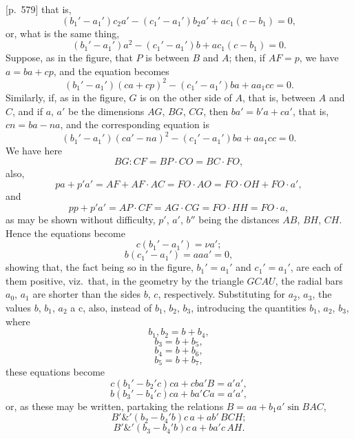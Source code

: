 \documentclass[11pt,a4paper]{article}
\theoremstyle{plain}
\theoremstyle{definition}
\theoremstyle{remark}
\begin{document}
[p.~579] that is,
\[
(b_1' - a_1') c_2 a' - (c_1' - a_1') b_2 a' + a c_1 (c - b_1) = 0,
\]
or, what is the same thing,
\[
(b_1' - a_1') a^2 - (c_1' - a_1') b + a c_1 (c - b_1) = 0.
\]
Suppose, as in the figure, that $P$ is between $B$ and $A$; then, if $AF = p$, we have $a = ba + cp$, and the equation becomes
\[
(b_1' - a_1') (ca + cp)^2 - (c_1' - a_1') b a + a a_1 c c = 0.
\]
Similarly, if, as in the figure, $G$ is on the other side of $A$, that is, between $A$ and $C$, and if $a$, $a'$ be the dimensions $AG$, $BG$, $CG$, then $b a' = b' a + c a'$, that is, $cn = ba - n a$, and the corresponding equation is
\[
(b_1' - a_1') (ca' - n a)^2 - (c_1' - a_1') b a + a a_1 c c = 0.
\]
We have here
\[
BG\colon CF = BP\cdot CO = BC\cdot FO,
\]
also,
\[
pa + p'a' = AF + AF\cdot AC = FO\cdot AO = FO\cdot OH + FO\cdot a',
\]
and
\[
pp + p'a' = AP\cdot CF = AG\cdot CG = FO\cdot HH = FO\cdot a,
\]
as may be shown without difficulty, $p'$, $a'$, $b''$ being the distances $AB$, $BH$, $CH$. Hence the equations become
\[
c(b_1' - a_1') = \nu a';
\]
\[
b(c_1' - a_1') = a a a' = 0,
\]
showing that, the fact being so in the figure, $b_1' = a_1'$ and $c_1' = a_1'$, are each of them positive, viz.\ that, in the geometry by the triangle $GCAU$, the radial bars $a_0$, $a_1$ are shorter than the sides $b$, $c$, respectively. Substituting for $a_2$, $a_3$, the values $b$, $b_1$, $a_2$ a c, also, instead of $b_1$, $b_2$, $b_3$, introducing the quantities $b_1$, $a_2$, $b_3$, where
\[
b_1, b_2 = b + b_4,
\]
\[
b_3 = b + b_5,
\]
\[
b_4 = b + b_6,
\]
\[
b_5 = b + b_7,
\]
these equations become
\[
c(b_1' - b_2'c) c a + cb a' B = a' a',
\]
\[
b(b_3' - b_4'c) c a + b a' C a = a' a',
\]
or, as these may be written, partaking the relations $B = a a + b_1 a' \sin BAC$,
\[
B'\&'(b_2 - b_4'b)c\, a + a b'\, BCH;
\]
\[
B'\&'(b_3 - b_4'b)c\, a + b a' c\, AH.
\]

\bigskip
\end{document}
